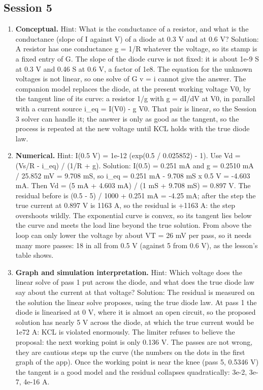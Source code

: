 \documentclass[11pt,a4paper]{article}
\begin{document}
\begin{enumerate}[nosep]
\end{enumerate}

\subsection*{Session 5}
\begin{enumerate}[nosep]
\item \textbf{Conceptual.} Hint: What is the conductance of a resistor, and what is the conductance (slope of I against V) of a diode at 0.3 V and at 0.6 V? Solution: A resistor has one conductance g = 1/R whatever the voltage, so its stamp is a fixed entry of G. The slope of the diode curve is not fixed: it is about 1e-9 S at 0.3 V and 0.46 S at 0.6 V, a factor of 1e8. The equation for the unknown voltages is not linear, so one solve of G v = i cannot give the answer. The companion model replaces the diode, at the present working voltage V0, by the tangent line of its curve: a resistor 1/g with g = dI/dV at V0, in parallel with a current source i\_eq = I(V0) - g V0. That pair is linear, so the Session 3 solver can handle it; the answer is only as good as the tangent, so the process is repeated at the new voltage until KCL holds with the true diode law.
\item \textbf{Numerical.} Hint: I(0.5 V) = 1e-12 (exp(0.5 / 0.025852) - 1). Use Vd = (Vs/R - i\_eq) / (1/R + g). Solution: I(0.5) = 0.251 mA and g = 0.2510 mA / 25.852 mV = 9.708 mS, so i\_eq = 0.251 mA - 9.708 mS x 0.5 V = -4.603 mA. Then Vd = (5 mA + 4.603 mA) / (1 mS + 9.708 mS) = 0.897 V. The residual before is (0.5 - 5) / 1000 + 0.251 mA = -4.25 mA; after the step the true current at 0.897 V is 1163 A, so the residual is +1163 A: the step overshoots wildly. The exponential curve is convex, so its tangent lies below the curve and meets the load line beyond the true solution. From above the loop can only lower the voltage by about VT = 26 mV per pass, so it needs many more passes: 18 in all from 0.5 V (against 5 from 0.6 V), as the lesson's table shows.
\item \textbf{Graph and simulation interpretation.} Hint: Which voltage does the linear solve of pass 1 put across the diode, and what does the true diode law say about the current at that voltage? Solution: The residual is measured on the solution the linear solve proposes, using the true diode law. At pass 1 the diode is linearised at 0 V, where it is almost an open circuit, so the proposed solution has nearly 5 V across the diode, at which the true current would be 1e72 A: KCL is violated enormously. The limiter refuses to believe the proposal: the next working point is only 0.136 V. The passes are not wrong, they are cautious steps up the curve (the numbers on the dots in the first graph of the app). Once the working point is near the knee (pass 5, 0.5346 V) the tangent is a good model and the residual collapses quadratically: 3e-2, 3e-7, 4e-16 A.

\end{enumerate}
\end{document}
